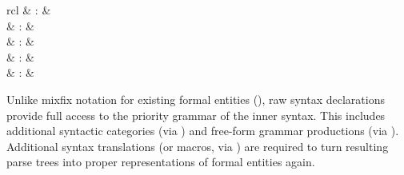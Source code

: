 \begin{isabellebody}
\begin{isamarkuptext}
\begin{description}
  \end{description}%
\end{isamarkuptext}%
\isamarkuptrue%
%
\isamarkuptrue%
%
\begin{isamarkuptext}%
\begin{matharray}{rcl}
    \hypertarget{command.nonterminal}{\hyperlink{command.nonterminal}{\mbox{}}} & : &  \\
    \hypertarget{command.syntax}{\hyperlink{command.syntax}{\mbox{}}} & : &  \\
    \hypertarget{command.no-syntax}{\hyperlink{command.no-syntax}{\mbox{}}} & : &  \\
    \hypertarget{command.translations}{\hyperlink{command.translations}{\mbox{}}} & : &  \\
    \hypertarget{command.no-translations}{\hyperlink{command.no-translations}{\mbox{}}} & : &  \\
  \end{matharray}

  Unlike mixfix notation for existing formal entities
  (), raw syntax declarations provide full access
  to the priority grammar of the inner syntax.  This includes
  additional syntactic categories (via \hyperlink{command.nonterminal}{\mbox{}}) and
  free-form grammar productions (via \hyperlink{command.syntax}{\mbox{}}).  Additional
  syntax translations (or macros, via \hyperlink{command.translations}{\mbox{}}) are
  required to turn resulting parse trees into proper representations
  of formal entities again.


\end{isamarkuptext}
\end{isabellebody}
